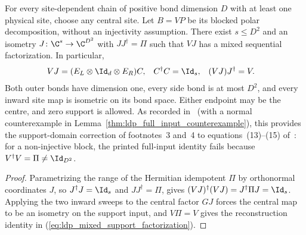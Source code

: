 \begin{lemma}
    \label{thm:ldp_mixed_polar_support}
    \leanok
    For every site-dependent chain of positive bond dimension $D$ with
    at least one physical site, choose any central site. Let $B=VP$ be
    its blocked polar decomposition, without an injectivity assumption.
    There exist $s\le D^2$ and an isometry
    $J\colon\C^s\to\C^{D^2}$ with $JJ^\dagger=\Pi$ such that $VJ$ has
    a mixed sequential factorization. In particular,
    \begin{align}
        VJ & =(E_L\otimes\Id_d\otimes E_R)C,
           & C^\dagger C                     & =\Id_s,
           & (VJ)J^\dagger                   & =V.
        \label{eq:ldp_mixed_support_factorization}
    \end{align}
    Both outer bonds have dimension one, every side bond is at most
    $D^2$, and every inward site map is isometric on its bond space.
    Either endpoint may be the centre, and zero support is allowed.
    As recorded in~\cite{gap:mswc24_mixed_polar_injectivity_scope}
    (with a normal counterexample in Lemma~\ref{thm:ldp_full_input_counterexample}),
    this provides the support-domain correction of footnotes~3 and~4 to
    equations~(13)--(15) of~\cite{Malz2024Preparation}: for a non-injective
    block, the printed full-input identity fails because
    $V^\dagger V=\Pi\ne\Id_{D^2}$.
\end{lemma}
\begin{proof}
    \leanok
    Parametrizing the range of the Hermitian idempotent $\Pi$ by orthonormal
    coordinates $J$, so $J^\dagger J=\Id_s$ and $JJ^\dagger=\Pi$, gives
    $(VJ)^\dagger(VJ)=J^\dagger\Pi J=\Id_s$.
    Applying the two inward sweeps to the central factor $GJ$
    forces the central map to be an isometry on the support input, and
    $V\Pi=V$ gives the reconstruction identity in
    (\ref{eq:ldp_mixed_support_factorization}).
\end{proof}
